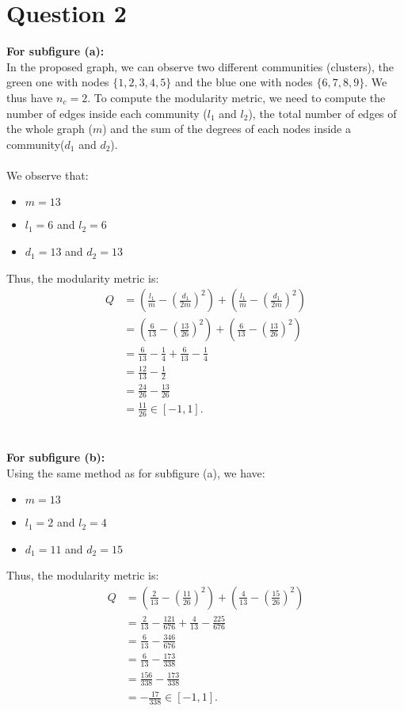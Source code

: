 \documentclass[a4paper]{article}
\begin{document}
\section*{Question 2}
\textbf{For subfigure (a):}
\\
In the proposed graph, we can observe two different communities (clusters),
the green one with nodes $\{1, 2, 3, 4, 5\}$ and the blue one with nodes $\{6, 7, 8, 9\}$.
We thus have $n_c=2$.
To compute the modularity metric, we need to compute the number of edges inside each community ($l_1$ and $l_2$),
the total number of edges of the whole graph ($m$) and the sum of the degrees of each nodes inside a community($d_1$ and $d_2$).
\\
\\
We observe that:
\begin{itemize}
    \item $m = 13$
    \item $l_1 = 6$ and $l_2 = 6$
    \item $d_1 = 13$ and $d_2 = 13$
\end{itemize}
Thus, the modularity metric is:
\begin{align*}
    Q &= \left(\frac{l_1}{m} - \left(\frac{d_1}{2m}\right)^2\right) + \left(\frac{l_1}{m} - \left(\frac{d_1}{2m}\right)^2\right) \\
    &= \left(\frac{6}{13} - \left(\frac{13}{26}\right)^2\right) + \left(\frac{6}{13} - \left(\frac{13}{26}\right)^2\right) \\
    &= \frac{6}{13} - \frac{1}{4} + \frac{6}{13} - \frac{1}{4} \\
    &= \frac{12}{13} - \frac{1}{2} \\
    &= \frac{24}{26} - \frac{13}{26} \\
    &= \frac{11}{26} \in [-1, 1].
\end{align*}
\\
\\
\textbf{For subfigure (b):}
\\
Using the same method as for subfigure (a), we have:
\begin{itemize}
    \item $m = 13$
    \item $l_1 = 2$ and $l_2 = 4$
    \item $d_1 = 11$ and $d_2 = 15$
\end{itemize}
Thus, the modularity metric is:
\begin{align*}
    Q &= \left(\frac{2}{13} - \left(\frac{11}{26}\right)^2\right) + \left(\frac{4}{13} - \left(\frac{15}{26}\right)^2\right) \\
    &= \frac{2}{13} - \frac{121}{676} + \frac{4}{13} - \frac{225}{676} \\
    &= \frac{6}{13} - \frac{346}{676} \\
    &= \frac{6}{13} - \frac{173}{338} \\
    &= \frac{156}{338} - \frac{173}{338} \\
    &= -\frac{17}{338} \in [-1, 1].
\end{align*}
\end{document}
